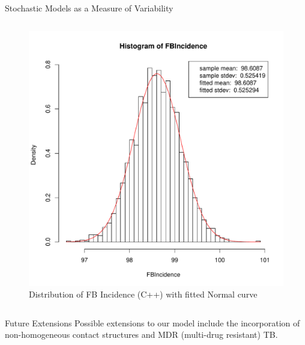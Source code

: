 \documentclass[final]{beamer}
\begin{document}
\begin{frame}
\begin{columns}
\begin{column}{.3\textwidth}
\begin{block}{Stochastic Models as a Measure of Variability}
\begin{block}{}
\begin{column}{.45\textwidth}
\begin{figure}[h]
\begin{center}
                \includegraphics[width=\textwidth]{IN1dist}
              \end{center}
              \caption{Distribution of FB Incidence (C++) with fitted Normal curve}
              \label{fig:IN1dist}
            \end{figure}
          \end{column}
        \end{block}
      \end{block}
      
      \begin{block}{Future Extensions}
        Possible extensions to our model include the incorporation of non-homogeneous
        contact structures and MDR (multi-drug resistant) TB.
      \end{block}
      
    \end{column}
  \end{columns}
\end{frame}
\end{document}
